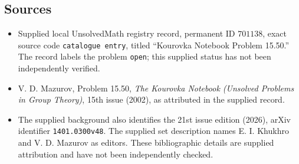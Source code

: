 \documentclass[11pt]{article}
\begin{document}
\subsection{Sources}
\begin{itemize}
\item Supplied local UnsolvedMath registry record, permanent ID \(701138\), exact source code \texttt{catalogue entry}, titled ``Kourovka Notebook Problem 15.50.'' The record labels the problem \texttt{open}; this supplied status has not been independently verified.
\item V. D. Mazurov, Problem 15.50, \emph{The Kourovka Notebook (Unsolved Problems in Group Theory)}, 15th issue (2002), as attributed in the supplied record.
\item The supplied background also identifies the 21st issue edition (2026), arXiv identifier \texttt{1401.0300v48}. The supplied set description names E. I. Khukhro and V. D. Mazurov as editors. These bibliographic details are supplied attribution and have not been independently checked.
\end{itemize}
\end{document}
